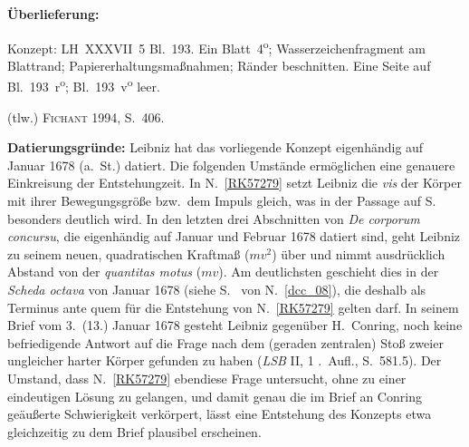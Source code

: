 %  
%				
%							
%
%
\frenchspacing
%
\begin{ledgroupsized}[r]{120mm}
\footnotesize
\pstart
\noindent\textbf{Überlieferung:}
\pend
\end{ledgroupsized}
%
\begin{ledgroupsized}[r]{114mm}
\footnotesize
\pstart \parindent -6mm
%
Konzept:
LH~XXXVII~5 Bl.~193. %
Ein Blatt~4\textsuperscript{o};
Wasserzeichenfragment am Blattrand;
Papiererhaltungsmaßnahmen;
Ränder beschnitten.
Eine Seite auf Bl.~193~r\textsuperscript{o}; Bl.~193~v\textsuperscript{o} leer.
\pend
\end{ledgroupsized}
%
\begin{ledgroupsized}[r]{114mm}
\footnotesize
\pstart
\parindent -6mm
%
(tlw.) \textsc{Fichant} 1994, S.~406\cite{01056}.
\pend%
\end{ledgroupsized}
%
%
\vspace{5mm}
\begin{ledgroup}
\footnotesize
\pstart
\noindent%
\textbf{Datierungsgründe:}
Leibniz hat das vorliegende Konzept eigenhändig auf Januar 1678 (a.~St.) datiert. 
%
Die folgenden Umstände ermöglichen eine genauere Einkreisung der Entstehungzeit.
%
\pend
%
\pstart
%
In N.~\ref{RK57279} setzt Leibniz die \textit{vis} der Körper mit ihrer Bewegungsgröße bzw.\ dem Impuls gleich, was in der Passage auf S.~ besonders deutlich wird.
%
In den letzten drei Abschnitten von \textit{De corporum concursu}, die eigenhändig auf Januar und Februar 1678 datiert sind, geht Leibniz zu seinem neuen, quadratischen Kraftmaß ($mv^2$) über und nimmt ausdrücklich Abstand von der \textit{quantitas motus} ($mv$). Am deutlichsten geschieht dies in der \textit{Scheda octava} von Januar 1678 
%
(siehe S.~ von N.~\ref{dcc_08}), 
%
die deshalb als Terminus ante quem für die Entstehung von N.~\ref{RK57279} gelten darf.
%
\pend
%
\pstart
In seinem
\cite{02053}Brief vom 3.\ (13.) Januar 1678 
gesteht Leibniz gegenüber
\protect{}H.~Conring,
noch keine befriedigende Antwort auf die Frage
nach dem (geraden zentralen) Stoß zweier ungleicher harter Körper gefunden zu haben
%
(\textit{LSB} II, 1 .~Aufl.\rbrack, S.~581.5).
%
Der Umstand, dass N.~\ref{RK57279}
ebendiese Frage untersucht, ohne zu einer eindeutigen Lösung zu gelangen,
und damit genau die im Brief an 
\protect{}Conring
geäußerte Schwierigkeit verkörpert,
lässt eine Entstehung des Konzepts etwa gleichzeitig zu dem Brief plausibel erscheinen.
%
\pend 
\end{ledgroup}
